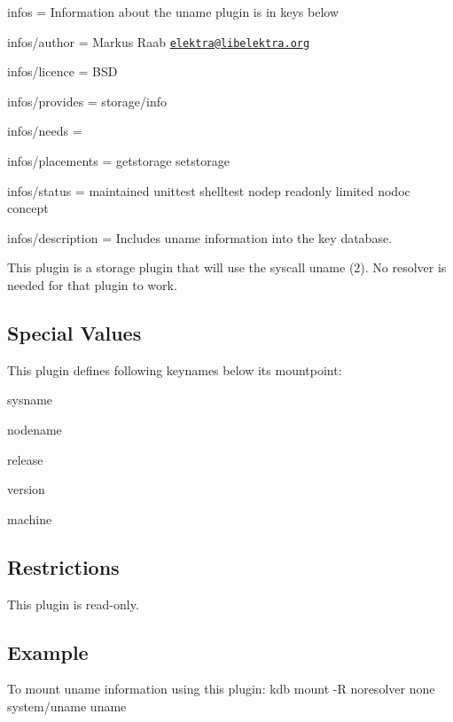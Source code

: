 
\begin{DoxyItemize}
\item infos = Information about the uname plugin is in keys below
\item infos/author = Markus Raab \href{mailto:elektra@libelektra.org}{\tt elektra@libelektra.\+org}
\item infos/licence = B\+SD
\item infos/provides = storage/info
\item infos/needs =
\item infos/placements = getstorage setstorage
\item infos/status = maintained unittest shelltest nodep readonly limited nodoc concept
\item infos/description = Includes uname information into the key database.
\end{DoxyItemize}

This plugin is a storage plugin that will use the syscall {\ttfamily uname (2)}. No resolver is needed for that plugin to work.

\subsection*{Special Values}

This plugin defines following keynames below its mountpoint\+:


\begin{DoxyItemize}
\item sysname
\item nodename
\item release
\item version
\item machine
\end{DoxyItemize}

\subsection*{Restrictions}

This plugin is read-\/only.

\subsection*{Example}

To mount uname information using this plugin\+: {\ttfamily kdb mount -\/R noresolver none system/uname uname} 